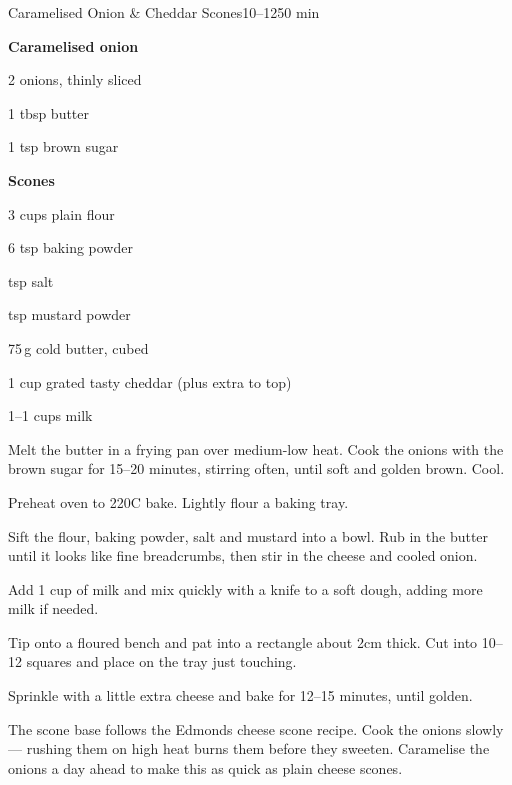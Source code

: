 \begin{recipebox}{Caramelised Onion \& Cheddar Scones}{10--12}{50 min}
\begin{ingredients}
  \item[] \textbf{Caramelised onion}
  \item 2 onions, thinly sliced
  \item 1 tbsp butter
  \item 1 tsp brown sugar
  \item[] \textbf{Scones}
  \item 3 cups plain flour
  \item 6 tsp baking powder
  \item {} tsp salt
  \item {} tsp mustard powder
  \item 75\,g cold butter, cubed
  \item 1 cup grated tasty cheddar (plus extra to top)
  \item 1--1 cups milk
\end{ingredients}

\begin{method}
  \item Melt the butter in a frying pan over medium-low heat. Cook the onions with the brown sugar for 15--20 minutes, stirring often, until soft and golden brown. Cool.
  \item Preheat oven to 220\degree C bake. Lightly flour a baking tray.
  \item Sift the flour, baking powder, salt and mustard into a bowl. Rub in the butter until it looks like fine breadcrumbs, then stir in the cheese and cooled onion.
  \item Add 1 cup of milk and mix quickly with a knife to a soft dough, adding more milk if needed.
  \item Tip onto a floured bench and pat into a rectangle about 2cm thick. Cut into 10--12 squares and place on the tray just touching.
  \item Sprinkle with a little extra cheese and bake for 12--15 minutes, until golden.
\end{method}

\begin{notes}
The scone base follows the Edmonds cheese scone recipe. Cook the onions slowly --- rushing them on high heat burns them before they sweeten.
Caramelise the onions a day ahead to make this as quick as plain cheese scones.
\end{notes}
\end{recipebox}
